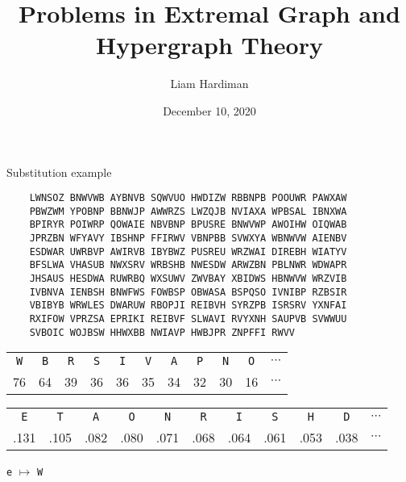 \documentclass[8pt]{beamer}
\title{Problems in Extremal Graph and Hypergraph Theory}
\author{Liam Hardiman}
\date{December 10, 2020}
\theoremstyle{plain}
\begin{document}
\begin{frame}[fragile]{Substitution example}
\begin{center}
\begin{BVerbatim}
    LWNSOZ BNWVWB AYBNVB SQWVUO HWDIZW RBBNPB POOUWR PAWXAW
    PBWZWM YPOBNP BBNWJP AWWRZS LWZQJB NVIAXA WPBSAL IBNXWA
    BPIRYR POIWRP QOWAIE NBVBNP BPUSRE BNWVWP AWOIHW OIQWAB
    JPRZBN WFYAVY IBSHNP FFIRWV VBNPBB SVWXYA WBNWVW AIENBV
    ESDWAR UWRBVP AWIRVB IBYBWZ PUSREU WRZWAI DIREBH WIATYV
    BFSLWA VHASUB NWXSRV WRBSHB NWESDW ARWZBN PBLNWR WDWAPR
    JHSAUS HESDWA RUWRBQ WXSUWV ZWVBAY XBIDWS HBNWVW WRZVIB
    IVBNVA IENBSH BNWFWS FOWBSP OBWASA BSPQSO IVNIBP RZBSIR
    VBIBYB WRWLES DWARUW RBOPJI REIBVH SYRZPB ISRSRV YXNFAI
    RXIFOW VPRZSA EPRIKI REIBVF SLWAVI RVYXNH SAUPVB SVWWUU
    SVBOIC WOJBSW HHWXBB NWIAVP HWBJPR ZNPFFI RWVV
\end{BVerbatim}
\end{center}
    \pause
    \begin{center}
    \begin{tabular}{c c c c c c c c c c c}
        \texttt{W} & \texttt{B} & \texttt{R} & \texttt{S} & \texttt{I} & \texttt{V} & \texttt{A} & \texttt{P} & \texttt{N} & \texttt{O} & $\cdots$\\
        76 & 64 & 39 & 36 & 36 & 35 & 34 & 32 & 30 & 16 & $\cdots$
    \end{tabular}
    \end{center}
    \pause
    \begin{center}
    \begin{tabular}{c c c c c c c c c c c}
    \texttt{E} & \texttt{T} & \texttt{A} & \texttt{O} & \texttt{N} & \texttt{R} & \texttt{I} & \texttt{S} & \texttt{H} & \texttt{D} & $\cdots$\\
    .131 & .105 & .082 & .080 & .071 & .068 & .064 & .061 & .053 & .038 & $\cdots$
    \end{tabular}
    \end{center}
    \pause

    \begin{center}
        \texttt{e} $\mapsto$ \texttt{W}
    \end{center}
\end{frame}
\end{document}
